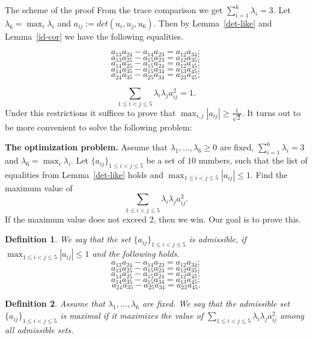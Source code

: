 \documentclass[12pt]{article}
\newtheorem{definition}{Definition}[section]
\begin{document}
\begin{section}{The scheme of the proof}
        From the trace comparison we get $\sum_{i=1}^{6} \lambda_{i} = 3.$ Let $\lambda_{6} = \max_{i}\lambda_{i}$ and  $a_{ij}:=det(u_{i},u_{j},u_{6}).$ Then by Lemma~\ref{det-like} and Lemma~\ref{id-cor} we have the following equalities. 

        $$
            a_{13}a_{24} - a_{14}a_{23} = a_{12}a_{34};
        $$
        $$
            a_{13}a_{25} - a_{15}a_{23} = a_{12}a_{35};
        $$
        $$
            a_{14}a_{25} - a_{15}a_{24} = a_{12}a_{45};
        $$
        $$
            a_{14}a_{35} - a_{15}a_{34} = a_{13}a_{45};
        $$
        $$
            a_{24}a_{35} - a_{25}a_{34} = a_{23}a_{45};
        $$

        $$
            \sum_{1\leq i<j\leq 5} \lambda_{i}\lambda_{j}a_{ij}^2= 1.
        $$
        Under this restrictions it suffices to prove that $\max_{i,j}|a_{ij}|\geq \frac{1}{\sqrt{2}}.$ It turns out to be more convenient to solve the following problem:

        \textbf{The optimization problem.} Assume that $\lambda_{1},\ldots, \lambda_{6} \geq 0$ are fixed,  $\sum_{i=1}^{6}\lambda_{i} =3 $ and $\lambda_{6} = \max_{i}\lambda_{i}$. Let $\{a_{ij}\}_{1\leq i<j\leq 5}$ be a set of $10$ numbers, such that the list of equalities from Lemma~\ref{det-like} holds and $\max_{1\leq i<j\leq 5} |a_{ij}| \leq 1$. Find the maximum value of $$\sum_{1\leq i<j\leq 5}\lambda_{i}\lambda_{j}a_{ij}^2.$$ 
        If the maximum value does not exceed $2$, then we win. Our goal is to prove this. 
        
    \begin{definition}
        We say that the set $\{a_{ij}\}_{1\leq i<j\leq 5}$ is admissible, if  $\max_{1\leq i<j\leq 5} |a_{ij}| \leq 1$ and the following holds.
        $$
            a_{13}a_{24} - a_{14}a_{23} = a_{12}a_{34};
        $$
        $$
            a_{13}a_{25} - a_{15}a_{23} = a_{12}a_{35};
        $$
        $$
            a_{14}a_{25} - a_{15}a_{24} = a_{12}a_{45};
        $$
        $$
            a_{14}a_{35} - a_{15}a_{34} = a_{13}a_{45};
        $$
        $$
            a_{24}a_{35} - a_{25}a_{34} = a_{23}a_{45}.
        $$
    
    \end{definition}

\begin{definition} Assume that $\lambda_{1},\ldots, \lambda_{6}$ are fixed. 
    We say that the admissible set  $\{a_{ij}\}_{1\leq i<j\leq 5}$ is maximal if it maximizes the value of  $\sum_{1\leq i<j\leq 5}\lambda_{i}\lambda_{j}a_{ij}^2$ among all admissible sets.
\end{definition}


\end{section}
\end{document}
